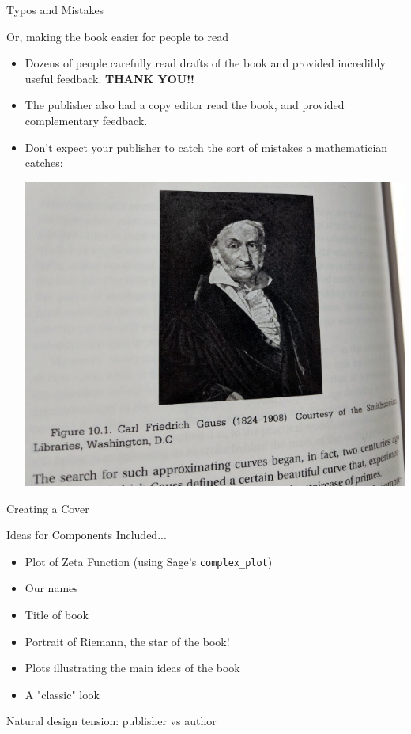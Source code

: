 \documentclass{beamer}
\begin{document}
\begin{frame}{Typos and Mistakes}
\begin{block}{Or, making the book easier for people to read}
  \begin{itemize}
    \item Dozens of people carefully read drafts of
          the book and provided incredibly useful feedback.
          \textbf{THANK YOU!!}
    \item The publisher also had a copy editor read the book,
          and provided complementary feedback.
    \item Don't expect your publisher to catch the sort of
          mistakes a mathematician catches:
          \begin{center}
            \includegraphics[height=.45\textheight]{pics/gauss}
          \end{center}
  \end{itemize}
  \end{block}
\end{frame}


\begin{frame}{Creating a Cover}


\begin{block}{Ideas for Components Included...}
  \begin{itemize}
    \item Plot of Zeta Function (using Sage's {\tt complex\_plot})
    \item Our names
    \item Title of book
    \item Portrait of Riemann, the star of the book!
    \item Plots illustrating the main ideas of the book
    \item A "classic" look
  \end{itemize}
\end{block}

\vfill
{\Large Natural design tension: publisher vs author}

\end{frame}
\end{document}
